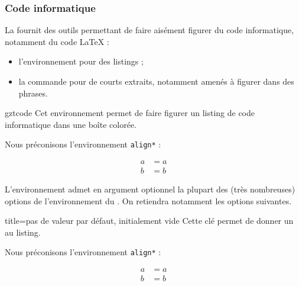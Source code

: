 \subsubsection{Code informatique}
\label{sec:commande-pour-code}

La \gztauthorcl{} fournit des outils permettant de faire aisément figurer du
code informatique, notamment du code \LaTeX{} :
\begin{itemize}
\item l'environnement  pour des listings ;
\item la commande  pour de courts extraits, notamment amenés
  à figurer dans des phrases.
\end{itemize}

\begin{docEnvironment}[doclang/environment content=listing]{gztcode}{}
  Cet environnement permet de faire figurer un listing de code informatique dans
  une boîte colorée.
\begin{bodycode}
Nous préconisons l'environnement \verb|align*| :
\begin{gztcode}
\begin{align*}
  a & = a\\
  b & = b
\end{align*}
\end{gztcode}
\end{bodycode}
\end{docEnvironment}

L'environnement  admet en argument optionnel la plupart des
(très nombreuses) options de l'environnement  du
. On retiendra notamment les options suivantes.

\begin{docKey}{title}{=}{pas de valeur par défaut,
    initialement vide}
  Cette clé permet de donner un  au listing.
\begin{bodycode}[listing and text,listing options={morekeywords={[2]title}}]
Nous préconisons l'environnement \verb|align*| :
\begin{gztcode}[title=Alignement d'équations]
\begin{align*}
  a & = a\\
  b & = b
\end{align*}
\end{gztcode}
\end{bodycode}
\end{docKey}

